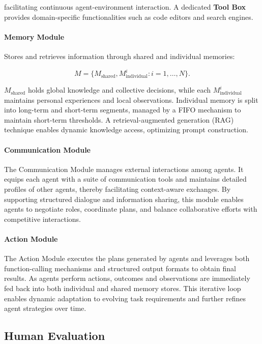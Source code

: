 facilitating continuous agent-environment interaction. A dedicated \textbf{Tool Box} provides domain-specific functionalities such as code editors and search engines.

\paragraph{Memory Module}
Stores and retrieves information through shared and individual memories:

\[
M = \{M_{\text{shared}}, M_{\text{individual}}^i : i = 1, \dots, N\}.
\]

$M_{\text{shared}}$ holds global knowledge and collective decisions, while each $M_{\text{individual}}^i$ maintains personal experiences and local observations. Individual memory is split into long-term and short-term segments, managed by a FIFO mechanism to maintain short-term thresholds. A retrieval-augmented generation (RAG) technique enables dynamic knowledge access, optimizing prompt construction.

\paragraph{Communication Module} 
The Communication Module manages external interactions among agents. It equips each agent with a suite of communication tools and maintains detailed profiles of other agents, thereby facilitating context-aware exchanges. By supporting structured dialogue and information sharing, this module enables agents to negotiate roles, coordinate plans, and balance collaborative efforts with competitive interactions.

\paragraph{Action Module} 
The Action Module executes the plans generated by agents and leverages both function-calling mechanisms and structured output formats to obtain final results. As agents perform actions, outcomes and observations are immediately fed back into both individual and shared memory stores. This iterative loop enables dynamic adaptation to evolving task requirements and further refines agent strategies over time.


\subsection{Human Evaluation}
\label{app:human-evaluation}

